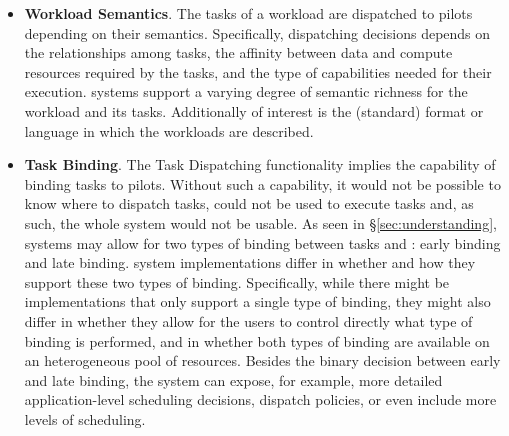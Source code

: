 \documentclass{sig-alternate}
\begin{document}
\begin{itemize}

\item \textbf{Workload Semantics}. The tasks of a workload are dispatched to
  pilots depending on their semantics. Specifically, dispatching decisions
  depends on the relationships among tasks, the affinity between data and
  compute resources required by the tasks, and the type of capabilities needed
  for their execution. \pilot systems support a varying degree of semantic
  richness for the workload and its tasks. Additionally of interest is the
  (standard) format or language in which the workloads are described.

\item \textbf{Task Binding}. The Task Dispatching functionality implies the
  capability of binding tasks to pilots. Without such a capability, it would
  not be possible to know where to dispatch tasks, \pilots could not be used to
  execute tasks and, as such, the whole \pilot system would not be usable. As
  seen in \S\ref{sec:understanding}, \pilot systems may allow for two types of
  binding between tasks and \pilots: early binding and late binding. \pilot
  system implementations differ in whether and how they support these two types
  of binding. Specifically, while there might be implementations that only
  support a single type of binding, they might also differ in whether they
  allow for the users to control directly what type of binding is performed,
  and in whether both types of binding are available on an heterogeneous pool
  of resources. Besides the binary decision between early and late binding, the
  \pilot system can expose, for example, more detailed application-level
  scheduling decisions, dispatch policies, or even include more levels of
  scheduling.



\end{itemize}
\end{document}
